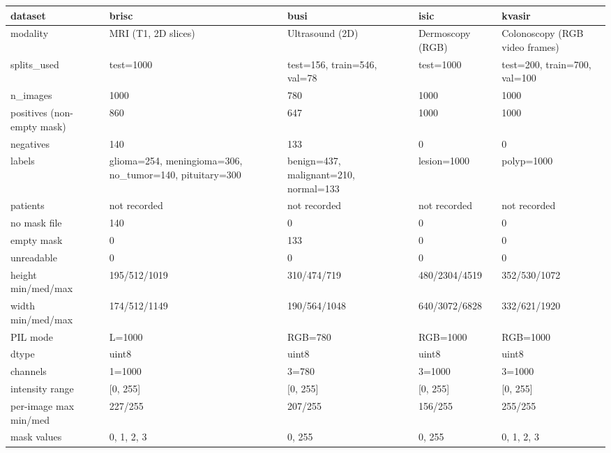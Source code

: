 \begin{tabular}{lllll}
\toprule
dataset & brisc & busi & isic & kvasir \\
\midrule
modality & MRI (T1, 2D slices) & Ultrasound (2D) & Dermoscopy (RGB) & Colonoscopy (RGB video frames) \\
splits_used & test=1000 & test=156, train=546, val=78 & test=1000 & test=200, train=700, val=100 \\
n_images & 1000 & 780 & 1000 & 1000 \\
positives (non-empty mask) & 860 & 647 & 1000 & 1000 \\
negatives & 140 & 133 & 0 & 0 \\
labels & glioma=254, meningioma=306, no_tumor=140, pituitary=300 & benign=437, malignant=210, normal=133 & lesion=1000 & polyp=1000 \\
patients & not recorded & not recorded & not recorded & not recorded \\
no mask file & 140 & 0 & 0 & 0 \\
empty mask & 0 & 133 & 0 & 0 \\
unreadable & 0 & 0 & 0 & 0 \\
height min/med/max & 195/512/1019 & 310/474/719 & 480/2304/4519 & 352/530/1072 \\
width min/med/max & 174/512/1149 & 190/564/1048 & 640/3072/6828 & 332/621/1920 \\
PIL mode & L=1000 & RGB=780 & RGB=1000 & RGB=1000 \\
dtype & uint8 & uint8 & uint8 & uint8 \\
channels & 1=1000 & 3=780 & 3=1000 & 3=1000 \\
intensity range & [0, 255] & [0, 255] & [0, 255] & [0, 255] \\
per-image max min/med & 227/255 & 207/255 & 156/255 & 255/255 \\
mask values & 0, 1, 2, 3 & 0, 255 & 0, 255 & 0, 1, 2, 3 \\
\bottomrule
\end{tabular}
